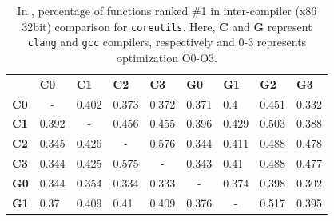 \begin{table}[t]
\scriptsize
\centering
\caption{In \tool, percentage of functions ranked \#1 in inter-compiler (x86 32bit) comparison for \texttt{coreutils}. Here, \textbf{C} and \textbf{G} represent \texttt{clang} and \texttt{gcc} compilers, respectively and 0-3 represents optimization O0-O3. }
\label{tab:cross-comp-inter}
\begin{tabular}{@{}lllllllll@{}}
\textbf{} & \textbf{C0} & \textbf{C1} & \textbf{C2} & \textbf{C3} & \textbf{G0} & \textbf{G1} & \textbf{G2} & \textbf{G3} \\ \cmidrule(l){2-9}
\multicolumn{1}{l|}{\textbf{C0}} & \multicolumn{1}{c|}{-} & \multicolumn{1}{l|}{0.402} & \multicolumn{1}{l|}{0.373} & \multicolumn{1}{l|}{0.372} & \multicolumn{1}{l|}{0.371} & \multicolumn{1}{l|}{0.4} & \multicolumn{1}{l|}{0.451} & \multicolumn{1}{l|}{0.332} \\ \cmidrule(l){2-9}
\multicolumn{1}{l|}{\textbf{C1}} & \multicolumn{1}{l|}{0.392} & \multicolumn{1}{c|}{-} & \multicolumn{1}{l|}{0.456} & \multicolumn{1}{l|}{0.455} & \multicolumn{1}{l|}{0.396} & \multicolumn{1}{l|}{0.429} & \multicolumn{1}{l|}{0.503} & \multicolumn{1}{l|}{0.388} \\ \cmidrule(l){2-9}
\multicolumn{1}{l|}{\textbf{C2}} & \multicolumn{1}{l|}{\cellcolor[HTML]{EFEFEF}0.345} & \multicolumn{1}{l|}{\cellcolor[HTML]{EFEFEF}0.426} & \multicolumn{1}{c|}{\cellcolor[HTML]{EFEFEF}-} & \multicolumn{1}{l|}{\cellcolor[HTML]{EFEFEF}0.576} & \multicolumn{1}{l|}{\cellcolor[HTML]{EFEFEF}0.344} & \multicolumn{1}{l|}{\cellcolor[HTML]{EFEFEF}0.411} & \multicolumn{1}{l|}{\cellcolor[HTML]{EFEFEF}0.488} & \multicolumn{1}{l|}{\cellcolor[HTML]{EFEFEF}0.478} \\ \cmidrule(l){2-9}
\multicolumn{1}{l|}{\textbf{C3}} & \multicolumn{1}{l|}{0.344} & \multicolumn{1}{l|}{0.425} & \multicolumn{1}{l|}{0.575} & \multicolumn{1}{c|}{-} & \multicolumn{1}{l|}{0.343} & \multicolumn{1}{l|}{0.41} & \multicolumn{1}{l|}{0.488} & \multicolumn{1}{l|}{0.477} \\ \cmidrule(l){2-9}
\multicolumn{1}{l|}{\textbf{G0}} & \multicolumn{1}{l|}{0.344} & \multicolumn{1}{l|}{0.354} & \multicolumn{1}{l|}{0.334} & \multicolumn{1}{l|}{0.333} & \multicolumn{1}{c|}{-} & \multicolumn{1}{l|}{0.374} & \multicolumn{1}{l|}{0.398} & \multicolumn{1}{l|}{0.302} \\ \cmidrule(l){2-9}
\multicolumn{1}{l|}{\textbf{G1}} & \multicolumn{1}{l|}{0.37} & \multicolumn{1}{l|}{0.409} & \multicolumn{1}{l|}{0.41} & \multicolumn{1}{l|}{0.409} & \multicolumn{1}{l|}{0.376} & \multicolumn{1}{c|}{-} & \multicolumn{1}{l|}{0.517} & \multicolumn{1}{l|}{0.395} \\ \cmidrule(l){2-9}

\end{tabular}
\end{table}
